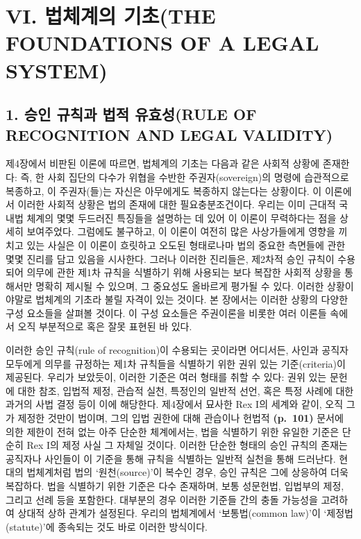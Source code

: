 \section{VI. 법체계의 기초(THE FOUNDATIONS OF A LEGAL
SYSTEM)}\label{vi.-uxbc95uxccb4uxacc4uxc758-uxae30uxcd08the-foundations-of-a-legal-system}

\subsection{1. 승인 규칙과 법적 유효성(RULE OF RECOGNITION AND LEGAL
VALIDITY)}\label{uxc2b9uxc778-uxaddcuxce59uxacfc-uxbc95uxc801-uxc720uxd6a8uxc131rule-of-recognition-and-legal-validity}

제4장에서 비판된 이론에 따르면, 법체계의 기초는 다음과 같은 사회적
상황에 존재한다: 즉, 한 사회 집단의 다수가 위협을 수반한
주권자(sovereign)의 명령에 습관적으로 복종하고, 이 주권자(들)는 자신은
아무에게도 복종하지 않는다는 상황이다. 이 이론에서 이러한 사회적 상황은
법의 존재에 대한 필요충분조건이다. 우리는 이미 근대적 국내법 체계의 몇몇
두드러진 특징들을 설명하는 데 있어 이 이론이 무력하다는 점을 상세히
보여주었다. 그럼에도 불구하고, 이 이론이 여전히 많은 사상가들에게 영향을
끼치고 있는 사실은 이 이론이 흐릿하고 오도된 형태로나마 법의 중요한
측면들에 관한 몇몇 진리를 담고 있음을 시사한다. 그러나 이러한 진리들은,
제2차적 승인 규칙이 수용되어 의무에 관한 제1차 규칙을 식별하기 위해
사용되는 보다 복잡한 사회적 상황을 통해서만 명확히 제시될 수 있으며, 그
중요성도 올바르게 평가될 수 있다. 이러한 상황이야말로 법체계의 기초라
불릴 자격이 있는 것이다. 본 장에서는 이러한 상황의 다양한 구성 요소들을
살펴볼 것이다. 이 구성 요소들은 주권이론을 비롯한 여러 이론들 속에서
오직 부분적으로 혹은 잘못 표현된 바 있다.

이러한 승인 규칙(rule of recognition)이 수용되는 곳이라면 어디서든,
사인과 공직자 모두에게 의무를 규정하는 제1차 규칙들을 식별하기 위한 권위
있는 기준(criteria)이 제공된다. 우리가 보았듯이, 이러한 기준은 여러
형태를 취할 수 있다: 권위 있는 문헌에 대한 참조, 입법적 제정, 관습적
실천, 특정인의 일반적 선언, 혹은 특정 사례에 대한 과거의 사법 결정 등이
이에 해당한다. 제4장에서 묘사한 Rex I의 세계와 같이, 오직 그가 제정한
것만이 법이며, 그의 입법 권한에 대해 관습이나 헌법적 \textbf{(p.~101)}
문서에 의한 제한이 전혀 없는 아주 단순한 체계에서는, 법을 식별하기 위한
유일한 기준은 단순히 Rex I의 제정 사실 그 자체일 것이다. 이러한 단순한
형태의 승인 규칙의 존재는 공직자나 사인들이 이 기준을 통해 규칙을
식별하는 일반적 실천을 통해 드러난다. 현대의 법체계처럼 법의
`원천(source)'이 복수인 경우, 승인 규칙은 그에 상응하여 더욱 복잡하다.
법을 식별하기 위한 기준은 다수 존재하며, 보통 성문헌법, 입법부의 제정,
그리고 선례 등을 포함한다. 대부분의 경우 이러한 기준들 간의 충돌
가능성을 고려하여 상대적 상하 관계가 설정된다. 우리의 법체계에서
`보통법(common law)'이 `제정법(statute)'에 종속되는 것도 바로 이러한
방식이다.

